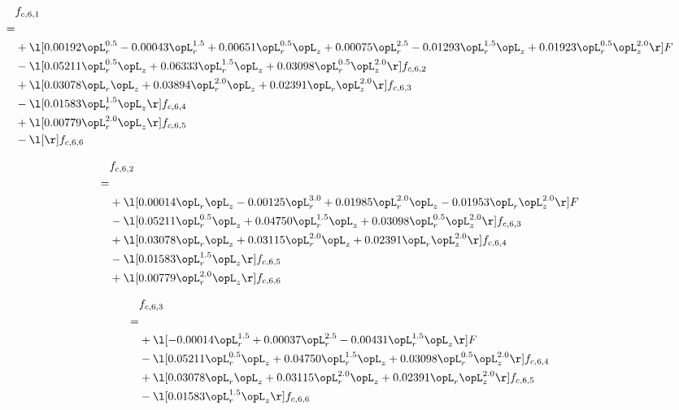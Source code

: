 \begin{alignat}{2} 
\label{eq:f_61_2} 
& f_{c,6,1} \nonumber \\ 
 = \\ 
& + \l[  0.00192 \opL_r^{0.5}   -0.00043 \opL_r^{1.5} +  0.00651 \opL_r^{0.5} \opL_z +  0.00075 \opL_r^{2.5}   -0.01293 \opL_r^{1.5} \opL_z +  0.01923 \opL_r^{0.5} \opL_z^{2.0}  \r] F \nonumber \\ 
& - \l[  0.05211 \opL_r^{0.5} \opL_z +  0.06333 \opL_r^{1.5} \opL_z +  0.03098 \opL_r^{0.5} \opL_z^{2.0}  \r] f_{c,6,2} \nonumber \\ 
& + \l[  0.03078 \opL_r \opL_z +  0.03894 \opL_r^{2.0} \opL_z +  0.02391 \opL_r \opL_z^{2.0}  \r] f_{c,6,3} \nonumber \\ 
& - \l[  0.01583 \opL_r^{1.5} \opL_z  \r] f_{c,6,4} \nonumber \\ 
& + \l[  0.00779 \opL_r^{2.0} \opL_z  \r] f_{c,6,5} \nonumber \\ 
& - \l[  \r] f_{c,6,6} \nonumber \\ 
\end{alignat} 


\begin{alignat}{2} 
\label{eq:f_62_2} 
& f_{c,6,2} \nonumber \\ 
 = \\ 
& + \l[  0.00014 \opL_r \opL_z   -0.00125 \opL_r^{3.0} +  0.01985 \opL_r^{2.0} \opL_z   -0.01953 \opL_r \opL_z^{2.0}  \r] F \nonumber \\ 
& - \l[  0.05211 \opL_r^{0.5} \opL_z +  0.04750 \opL_r^{1.5} \opL_z +  0.03098 \opL_r^{0.5} \opL_z^{2.0}  \r] f_{c,6,3} \nonumber \\ 
& + \l[  0.03078 \opL_r \opL_z +  0.03115 \opL_r^{2.0} \opL_z +  0.02391 \opL_r \opL_z^{2.0}  \r] f_{c,6,4} \nonumber \\ 
& - \l[  0.01583 \opL_r^{1.5} \opL_z  \r] f_{c,6,5} \nonumber \\ 
& + \l[  0.00779 \opL_r^{2.0} \opL_z  \r] f_{c,6,6} \nonumber \\ 
\end{alignat} 


\begin{alignat}{2} 
\label{eq:f_63_2} 
& f_{c,6,3} \nonumber \\ 
 = \\ 
& + \l[  -0.00014 \opL_r^{1.5} +  0.00037 \opL_r^{2.5}   -0.00431 \opL_r^{1.5} \opL_z  \r] F \nonumber \\ 
& - \l[  0.05211 \opL_r^{0.5} \opL_z +  0.04750 \opL_r^{1.5} \opL_z +  0.03098 \opL_r^{0.5} \opL_z^{2.0}  \r] f_{c,6,4} \nonumber \\ 
& + \l[  0.03078 \opL_r \opL_z +  0.03115 \opL_r^{2.0} \opL_z +  0.02391 \opL_r \opL_z^{2.0}  \r] f_{c,6,5} \nonumber \\ 
& - \l[  0.01583 \opL_r^{1.5} \opL_z  \r] f_{c,6,6} \nonumber \\ 
\end{alignat} 


